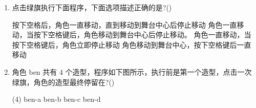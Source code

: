\documentclass[10pt, a4paper]{article}
\begin{document}
\begin{enumerate}
        \item 点击绿旗执行下面程序，下面选项描述正确的是?(\qquad)
        \begin{tasks}
            \task 按下空格后，角色一直移动，直到移动到舞台中心后停止移动
            \task 角色一直移动，当按下空格键后，角色移动到舞台中心后停止移动。
            \task 角色一直移动，当按下空格键后，角色立即停止移动
            \task 角色移动到舞台中心，按下空格键后一直移动
        \end{tasks}

        \item 角色 ben 共有 4 个造型，程序如下图所示，执行前是第一个造型，点击一次绿旗，角色的造型最终停留在?(\qquad)
        \begin{tasks}(4)
            \task ben-a
            \task ben-b
            \task ben-c
            \task ben-d
        \end{tasks}
        

\end{enumerate}
\end{document}
